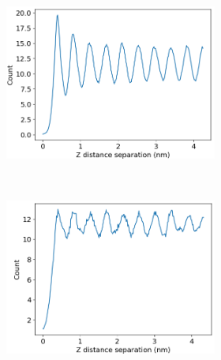 \documentclass{article}
\begin{document}
\begin{figure}[ht]
\begin{subfigure}{.45\linewidth}
\begin{subfigure}{\linewidth}
                \includegraphics[width=\textwidth]{zdf_5_layered.png}
                \caption{}~\label{fig:rz_offset}
        \end{subfigure}
\end{subfigure}
\begin{subfigure}{.45\linewidth}
	\begin{subfigure}{\linewidth}
		\centering
		\includegraphics[width=\textwidth]{zdf_5_offset.png}
		\caption{}~\label{fig:rz_layered}
	\end{subfigure}
	\begin{subfigure}{\linewidth}
		\centering

\end{subfigure}
\end{subfigure}
\end{figure}
\end{document}
